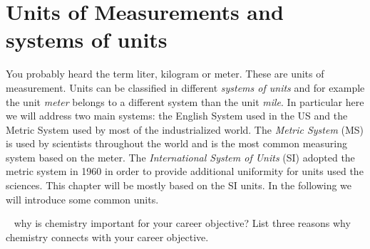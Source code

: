 \documentclass[main.tex]{subfiles}
\begin{document}
\section{Units of Measurements and systems of units}

You probably heard the term liter, kilogram or meter. These are units of measurement. Units can be classified in different \emph{systems of units} and for example the unit \emph{meter} belongs to a different system than the unit \emph{mile}. In particular here we will address two main systems: the English System used in the US and the Metric System used by most of the industrialized world.
The \emph{Metric System} (MS) is used by  scientists throughout the world and is the most common measuring system based on the meter. The \emph{International System of Units} (SI) adopted the metric system in 1960 in order to provide additional uniformity for units used the sciences. This chapter will be mostly based on the SI units. In the following we will introduce some common units.
\begin{marginfigure}[-2cm]
\begin{tcolorbox}[enhanced,colback=red!5!white,colframe=black!50!red,boxrule=1pt,
  arc=0pt,outer arc=0pt,drop heavy lifted shadow]
\faGears\ 
 why is chemistry important for your career objective? List three reasons why chemistry connects with your career objective. \end{tcolorbox}
 \end{marginfigure}
\sloppy
\end{document}
